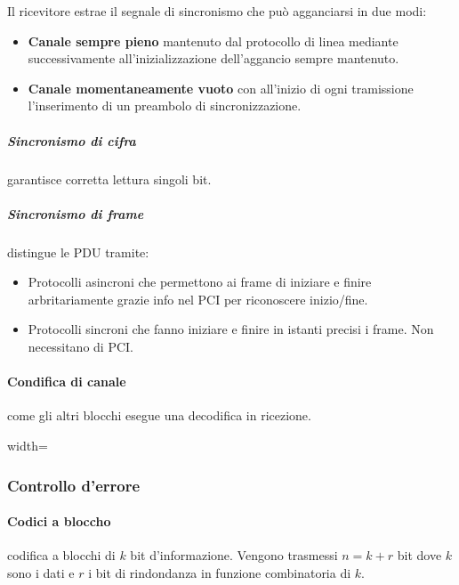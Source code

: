 Il ricevitore estrae il segnale di sincronismo che può agganciarsi in due modi:
\begin{itemize}
	\item \textbf{Canale sempre pieno} mantenuto dal protocollo di linea mediante successivamente all'inizializzazione dell'aggancio sempre mantenuto.
	\item \textbf{Canale momentaneamente vuoto} con all'inizio di ogni tramissione l'inserimento di un preambolo di sincronizzazione.
\end{itemize}
\subparagraph{Sincronismo di cifra} garantisce corretta lettura singoli bit.
\subparagraph{Sincronismo di frame} distingue le PDU tramite:
\begin{itemize}
	\item Protocolli asincroni che permettono ai frame di iniziare e finire arbritariamente grazie info nel PCI per riconoscere inizio/fine.
	\item Protocolli sincroni che fanno iniziare e finire in istanti precisi i frame. Non necessitano di PCI.
\end{itemize}
\paragraph{Condifica di canale} come gli altri blocchi esegue una decodifica in ricezione.

\begin{adjustbox}{width=\textwidth}
\end{adjustbox}
\subsubsection{Controllo d'errore}
\paragraph{Codici a bloccho} codifica a blocchi di $k$ bit d'informazione. Vengono trasmessi $n=k+r$ bit dove $k$ sono i dati e $r$ i bit di rindondanza in funzione combinatoria di $k$.

